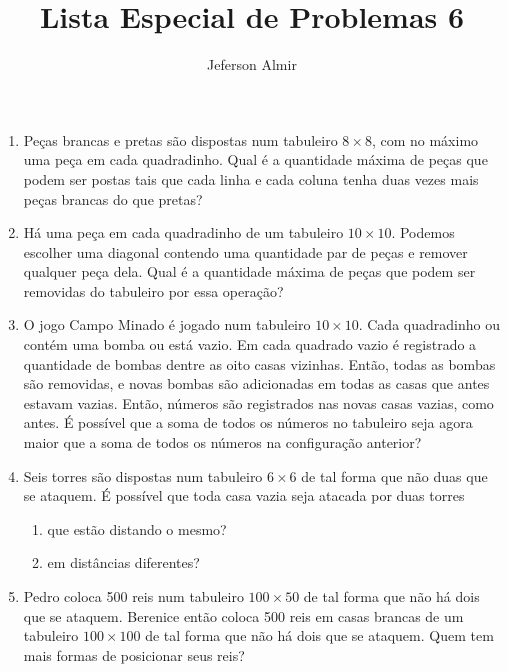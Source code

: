 \documentclass{article}
\title{Lista Especial de Problemas 6}
\author{Jeferson Almir}
\date{}
\begin{document}
\maketitle

\begin{enumerate}
    \item Peças brancas e pretas são dispostas num tabuleiro $8\times 8$,
    com no máximo uma peça em cada quadradinho.
    Qual é a quantidade máxima de peças que podem ser postas tais que
    cada linha e cada coluna tenha duas vezes mais peças brancas do que pretas?
    
    \item Há uma peça em cada quadradinho de um tabuleiro $10\times 10$.
    Podemos escolher uma diagonal contendo uma quantidade par de peças
    e remover qualquer peça dela.
    Qual é a quantidade máxima de peças que podem ser removidas do tabuleiro por essa operação?
    
    \item O jogo Campo Minado é jogado num tabuleiro $10\times 10$.
    Cada quadradinho ou contém uma bomba ou está vazio.
    Em cada quadrado vazio é registrado a quantidade de bombas dentre as oito casas vizinhas.
    Então, todas as bombas são removidas,
    e novas bombas são adicionadas em todas as casas que antes estavam vazias.
    Então, números são registrados nas novas casas vazias, como antes.
    É possível que a soma de todos os números no tabuleiro seja agora
    maior que a soma de todos os números na configuração anterior?
    
    \item Seis torres são dispostas num tabuleiro $6\times 6$
    de tal forma que não duas que se ataquem.
    É possível que toda casa vazia seja atacada por duas torres
    
    \begin{enumerate}
    \item que estão distando o mesmo?
    
    \item em distâncias diferentes?
    \end{enumerate}
    
    \item Pedro coloca 500 reis num tabuleiro $100\times 50$
    de tal forma que não há dois que se ataquem.
    Berenice então coloca 500 reis em casas brancas de um tabuleiro $100 \times 100$ de tal forma que não há dois que se ataquem.
    Quem tem mais formas de posicionar seus reis?
    

\end{enumerate}
\end{document}
